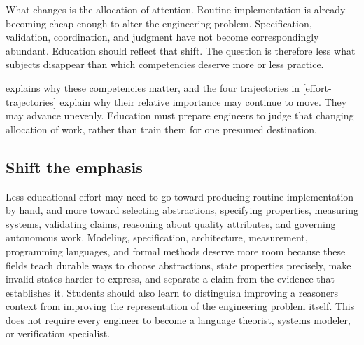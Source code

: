 What changes is the allocation of attention. Routine implementation is already becoming cheap enough to alter the engineering problem. Specification, validation, coordination, and judgment have not become correspondingly abundant. Education should reflect that shift. The question is therefore less what subjects disappear than which competencies deserve more or less practice.


 explains why these competencies matter, and the four trajectories in \autoref{effort-trajectories} explain why their relative importance may continue to move. They may advance unevenly. Education must prepare engineers to judge that changing allocation of work, rather than train them for one presumed destination.

\subsection{Shift the emphasis}\label{heading:shift-the-emphasis}


Less educational effort may need to go toward producing routine implementation by hand, and more toward selecting abstractions, specifying properties, measuring systems, validating claims, reasoning about quality attributes, and governing autonomous work. Modeling, specification, architecture, measurement, programming languages, and formal methods deserve more room because these fields teach durable ways to choose abstractions, state properties precisely, make invalid states harder to express, and separate a claim from the evidence that establishes it. Students should also learn to distinguish improving a reasoner\textquotesingle s context from improving the representation of the engineering problem itself. This does not require every engineer to become a language theorist, systems modeler, or verification specialist.


